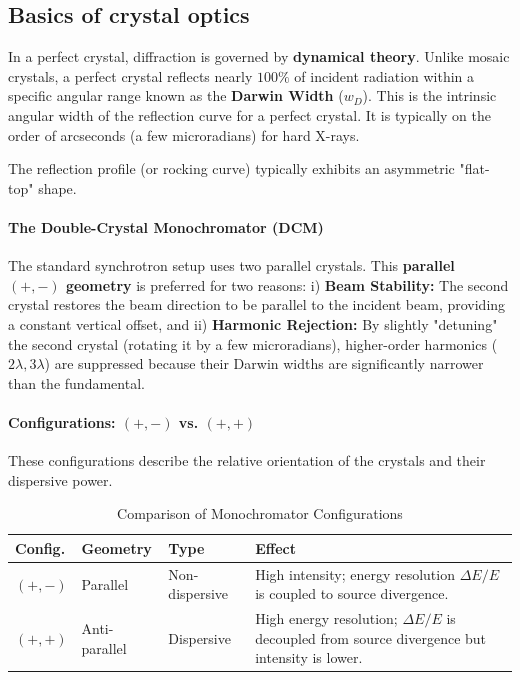 

\subsection{Basics of crystal optics}

In a perfect crystal, diffraction is governed by \textbf{dynamical theory}. Unlike mosaic crystals, a perfect crystal reflects nearly $100\%$ of incident radiation within a specific angular range known as the \textbf{Darwin Width} ($w_D$). This is the intrinsic angular width of the reflection curve for a perfect crystal. It is typically on the order of arcseconds (a few microradians) for hard X-rays.

The reflection profile (or rocking curve) typically exhibits an asymmetric "flat-top" shape. 

\paragraph{The Double-Crystal Monochromator (DCM)}
The standard synchrotron setup uses two parallel crystals. This \textbf{parallel $(+, -)$ geometry} is preferred for two reasons:
i) \textbf{Beam Stability:} The second crystal restores the beam direction to be parallel to the incident beam, providing a constant vertical offset, and 
ii) \textbf{Harmonic Rejection:} By slightly "detuning" the second crystal (rotating it by a few microradians), higher-order harmonics ($2\lambda, 3\lambda$) are suppressed because their Darwin widths are significantly narrower than the fundamental.

\paragraph{Configurations: $(+, -)$ vs. $(+, +)$}
These configurations describe the relative orientation of the crystals and their dispersive power.

\begin{table}[h]
\centering
\begin{tabular}{@{}lll p{6cm}@{}}
\hline
\textbf{Config.} & \textbf{Geometry} & \textbf{Type} & \textbf{Effect} \\
\hline
$(+, -)$ & Parallel & Non-dispersive & High intensity; energy resolution $\Delta E/E$ is coupled to source divergence. \\
$(+, +)$ & Anti-parallel & Dispersive & High energy resolution; $\Delta E/E$ is decoupled from source divergence but intensity is lower. \\
\hline
\end{tabular}
\caption{Comparison of Monochromator Configurations}
\end{table}

